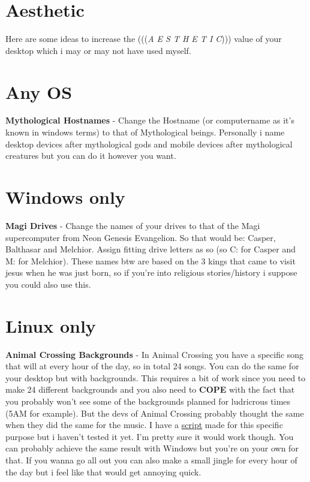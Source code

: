 \documentclass{article}
\begin{document}
\section{Aesthetic}
Here are some ideas to increase the (((\emph{A E S T H E T I C}))) value of your desktop which i may or may not have used myself.
\section{Any OS}
\textbf{Mythological Hostnames} - Change the Hostname (or computername as it's known in windows terms) to that of Mythological beings. Personally i name desktop devices after mythological gods and mobile devices after mythological creatures but you can do it however you want.
\section{Windows only}
\textbf{Magi Drives} - Change the names of your drives to that of the Magi supercomputer from Neon Genesis Evangelion. So that would be: Casper, Balthasar and Melchior. Assign fitting drive letters as so (so C: for Casper and M: for Melchior). These names btw are based on the 3 kings that came to visit jesus when he was just born, so if you're into religious stories/history i suppose you could also use this.
\section{Linux only}
\textbf{Animal Crossing Backgrounds} - In Animal Crossing you have a specific song that will at every hour of the day, so in total 24 songs. You can do the same for your desktop but with backgrounds. This requires a bit of work since you need to make 24 different backgrounds and you also need to \textbf{COPE} with the fact that you probably won't see some of the backgrounds planned for ludricrous times (5AM for example). But the devs of Animal Crossing probably thought the same when they did the same for the music. I have a \href{https://github.com/marcello505/configfiles/blob/master/.scripts/clockbackgrounds.sh}{script} made for this specific purpose but i haven't tested it yet. I'm pretty sure it would work though. You can probably achieve the same result with Windows but you're on your own for that. If you wanna go all out you can also make a small jingle for every hour of the day but i feel like that would get annoying quick.
\end{document}

